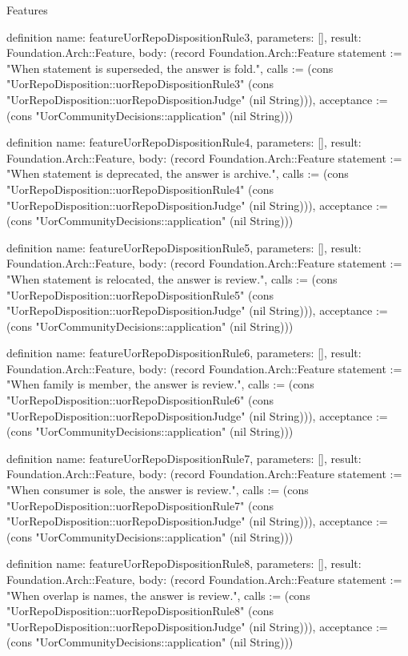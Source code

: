 \begin{lexlean}{Features}
\begin{semanticmodule}
definition{
  name: featureUorRepoDispositionRule3,
  parameters: [],
  result: Foundation.Arch::Feature,
  body: (record Foundation.Arch::Feature {statement := "When statement is superseded, the answer is fold.", calls := (cons "UorRepoDisposition::uorRepoDispositionRule3" (cons "UorRepoDisposition::uorRepoDispositionJudge" (nil String))), acceptance := (cons "UorCommunityDecisions::application" (nil String))})
}

definition{
  name: featureUorRepoDispositionRule4,
  parameters: [],
  result: Foundation.Arch::Feature,
  body: (record Foundation.Arch::Feature {statement := "When statement is deprecated, the answer is archive.", calls := (cons "UorRepoDisposition::uorRepoDispositionRule4" (cons "UorRepoDisposition::uorRepoDispositionJudge" (nil String))), acceptance := (cons "UorCommunityDecisions::application" (nil String))})
}

definition{
  name: featureUorRepoDispositionRule5,
  parameters: [],
  result: Foundation.Arch::Feature,
  body: (record Foundation.Arch::Feature {statement := "When statement is relocated, the answer is review.", calls := (cons "UorRepoDisposition::uorRepoDispositionRule5" (cons "UorRepoDisposition::uorRepoDispositionJudge" (nil String))), acceptance := (cons "UorCommunityDecisions::application" (nil String))})
}

definition{
  name: featureUorRepoDispositionRule6,
  parameters: [],
  result: Foundation.Arch::Feature,
  body: (record Foundation.Arch::Feature {statement := "When family is member, the answer is review.", calls := (cons "UorRepoDisposition::uorRepoDispositionRule6" (cons "UorRepoDisposition::uorRepoDispositionJudge" (nil String))), acceptance := (cons "UorCommunityDecisions::application" (nil String))})
}

definition{
  name: featureUorRepoDispositionRule7,
  parameters: [],
  result: Foundation.Arch::Feature,
  body: (record Foundation.Arch::Feature {statement := "When consumer is sole, the answer is review.", calls := (cons "UorRepoDisposition::uorRepoDispositionRule7" (cons "UorRepoDisposition::uorRepoDispositionJudge" (nil String))), acceptance := (cons "UorCommunityDecisions::application" (nil String))})
}

definition{
  name: featureUorRepoDispositionRule8,
  parameters: [],
  result: Foundation.Arch::Feature,
  body: (record Foundation.Arch::Feature {statement := "When overlap is names, the answer is review.", calls := (cons "UorRepoDisposition::uorRepoDispositionRule8" (cons "UorRepoDisposition::uorRepoDispositionJudge" (nil String))), acceptance := (cons "UorCommunityDecisions::application" (nil String))})
}


\end{semanticmodule}
\end{lexlean}
